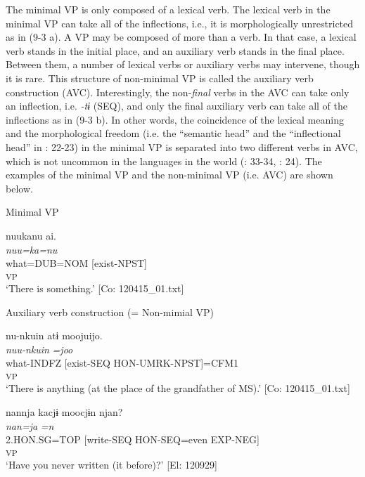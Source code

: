 The minimal VP is only composed of a lexical verb. The lexical verb in the minimal VP can take all of the inflections, i.e., it is morphologically unrestricted as in (9-3 a). A VP may be composed of more than a verb. In that case, a lexical verb stands in the initial place, and an auxiliary verb stands in the final place. Between them, a number of lexical verbs or auxiliary verbs may intervene, though it is rare. This structure of non-minimal VP is called the auxiliary verb construction (AVC). Interestingly, the non-\textit{final} verbs in the AVC can take only an inflection, i.e. \textit{{}-tɨ} (SEQ), and only the final auxiliary verb can take all of the inflections as in (9-3 b). In other words, the coincidence of the lexical meaning and the morphological freedom (i.e. the “semantic head” and the “inflectional head” in \citealt{Anderson2006}: 22-23) in the minimal VP is separated into two different verbs in AVC, which is not uncommon in the languages in the world (\citealt{Lehmann1995}: 33-34, \citealt{Anderson2006}: 24). The examples of the minimal VP and the non-minimal VP (i.e. AVC) are shown below.

\ea  \label{ex:9.4}

\exi{} Minimal VP 

\ea %
 \gllll  nuukanu  ai.\\
      \textit{nuu=ka=nu}  \textit{}\\
      what=DUB=NOM  [exist-NPST]\\
        [Lex. V]\textsubscript{VP}\\
      \glt       ‘There is something.’ [Co: 120415\_01.txt]

\exi{}  Auxiliary verb construction (= Non-mimial VP)

\ex \label{ex:.b} %
    \gllll  nu-nkuin  atɨ  moojuijo.\\
      \textit{nuu-nkuin}  \textit{}  \textit{=joo}\\
      what-INDFZ  [exist-SEQ  HON-UMRK-NPST]=CFM1\\
        [Lex. V  Aux. V]\textsubscript{VP}\\
      \glt       ‘There is anything (at the place of the grandfather of MS).’ [Co: 120415\_01.txt]

\ex \label{ex:.c} %
    \gllll  nannja  kacjɨ  moocjɨn  njan?\\
      \textit{nan=ja}  \textit{}  \textit{=n}  \textit{}\\
      2.HON.SG=TOP  [write-SEQ  HON-SEQ=even  EXP-NEG]\\
        [Lex. V  Aux. V  Aux. V]\textsubscript{VP}\\
      \glt       ‘Have you never written (it before)?’ [El: 120929]
    \z
\z

